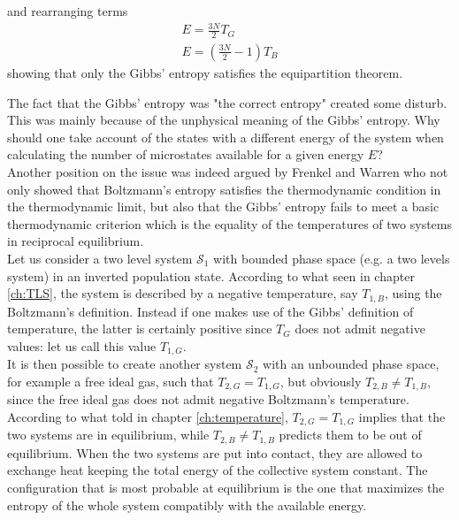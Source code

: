 and rearranging terms 
\begin{equation}\begin{gathered}
    E=\frac{3 N}{2} T_{G} \\
    E=\left(\frac{3 N}{2}-1\right) T_{B}
\end{gathered}
\label{eq:equipartition_results}
\end{equation}
showing that only the Gibbs' entropy satisfies the equipartition theorem. \par
\vspace{10pt}
The fact that the Gibbs' entropy was "the correct entropy" created some disturb. This was mainly because of the unphysical meaning of the Gibbs' entropy. Why should one 
take account of the states with a different energy of the system when calculating the number of microstates available for a given energy $E$? \\
Another position on the issue was indeed argued by Frenkel and Warren \cite{Frenkel} who not only showed that Boltzmann's entropy satisfies the thermodynamic condition in the thermodynamic limit, but also that the Gibbs' entropy fails to meet a basic thermodynamic criterion which is 
the equality of the temperatures of two systems in reciprocal equilibrium. \\
Let us consider a two level system $\mathcal{S}_1$ with bounded phase space (e.g. a two levels system) in an inverted population state. According to what seen in chapter \ref{ch:TLS}, the system is described by a negative temperature, say $T_{1,B}$, using the Boltzmann's definition. Instead if one makes use of the Gibbs' definition of temperature, the latter is certainly positive since $T_G$ does not admit negative values: let us call this value $T_{1,G}$. \\
It is then possible to create another system $\mathcal{S}_2$ with an unbounded phase space, for example a free ideal gas, such that $T_{2,G} = T_{1,G}$, but obviously $T_{2,B} \neq T_{1,B}$, since the free ideal gas does not admit negative Boltzmann's temperature. According to what told in chapter \ref{ch:temperature}, $T_{2,G} = T_{1,G}$ implies that the two systems are in equilibrium, while $T_{2,B} \neq T_{1,B}$ predicts them to be out of equilibrium. 
When the two systems are put into contact, they are allowed to exchange heat keeping the total energy of the collective system constant. The configuration that is most probable at equilibrium is the one that maximizes the entropy of the whole system compatibly with the available energy. \\
